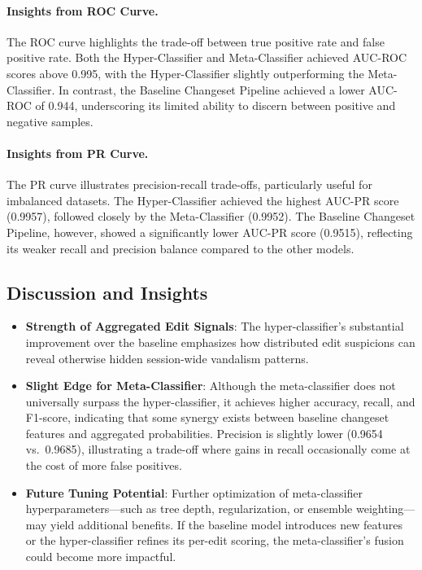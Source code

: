 \documentclass[
    13pt, %
    a4paper, %
    listof=totoc, %
    bibliography=totoc, %
    index=totoc, %
    headsepline
]{scrreprt}
\begin{document}
\paragraph{Insights from ROC Curve.}
The ROC curve highlights the trade-off between true positive rate and false positive rate. Both the Hyper-Classifier and Meta-Classifier achieved AUC-ROC scores above 0.995, with the Hyper-Classifier slightly outperforming the Meta-Classifier. In contrast, the Baseline Changeset Pipeline achieved a lower AUC-ROC of 0.944, underscoring its limited ability to discern between positive and negative samples.

\paragraph{Insights from PR Curve.}
The PR curve illustrates precision-recall trade-offs, particularly useful for imbalanced datasets. The Hyper-Classifier achieved the highest AUC-PR score (0.9957), followed closely by the Meta-Classifier (0.9952). The Baseline Changeset Pipeline, however, showed a significantly lower AUC-PR score (0.9515), reflecting its weaker recall and precision balance compared to the other models.


\subsection{Discussion and Insights}

\begin{itemize}
    \item \textbf{Strength of Aggregated Edit Signals}:
    The hyper-classifier’s substantial improvement over the baseline emphasizes how distributed edit suspicions can reveal otherwise hidden session-wide vandalism patterns.
    \item \textbf{Slight Edge for Meta-Classifier}:
    Although the meta-classifier does not universally surpass the hyper-classifier, it achieves higher accuracy, recall, and F1-score, indicating that some synergy exists between baseline changeset features and aggregated probabilities. Precision is slightly lower (0.9654 vs.\ 0.9685), illustrating a trade-off where gains in recall occasionally come at the cost of more false positives.
    \item \textbf{Future Tuning Potential}:
    Further optimization of meta-classifier hyperparameters—such as tree depth, regularization, or ensemble weighting—may yield additional benefits. If the baseline model introduces new features or the hyper-classifier refines its per-edit scoring, the meta-classifier’s fusion could become more impactful.
\end{itemize}
\end{document}
